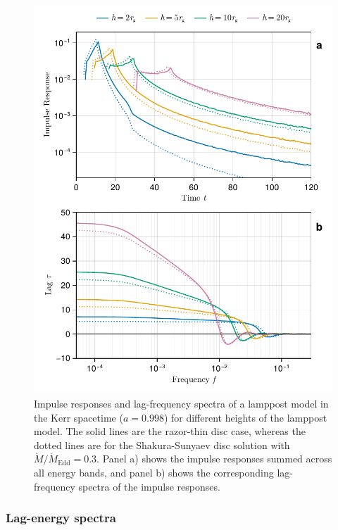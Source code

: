 \documentclass[fleqn,usenatbib]{mnras}
\begin{document}
\begin{figure}
    \centering
    \includegraphics[width=0.98\linewidth]{figures/reverberation.thin-disc.pdf}
    \caption{Impulse responses and lag-frequency spectra of a lamppost model in
        the Kerr spacetime ($a = 0.998$) for different heights of the lamppost
        model. The solid lines are the razor-thin disc case, whereas the dotted
        lines are for the Shakura-Sunyaev disc solution with $\dot{M} /
    \dot{M}_\text{Edd} = 0.3$. Panel a) shows the impulse responses summed
across all energy bands, and panel b) shows the corresponding lag-frequency
spectra of the impulse responses. }
    \label{fig:reverberation-thin}
\end{figure}


\subsubsection{Lag-energy spectra}
\end{document}
